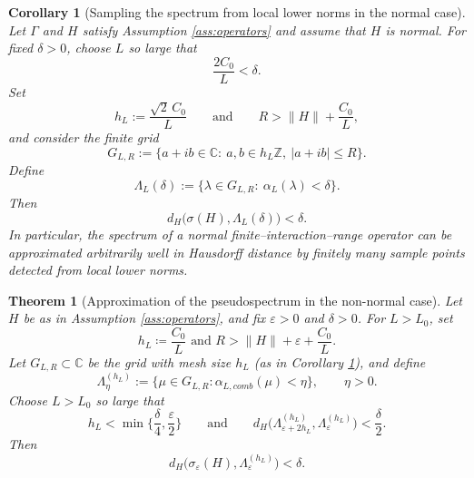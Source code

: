 \documentclass[10pt,a4paper]{amsart}
\newtheorem{corollary}{Corollary}
\newtheorem{theorem}{Theorem}
\newcommand{\C}{\mathbb{C}}
\newcommand{\Z}{\mathbb{Z}}
\begin{document}
\begin{corollary}[Sampling the spectrum from local lower norms in the normal case]
\label{cor:normal-sampling-grid}
Let $\Gamma$ and $H$ satisfy Assumption \ref{ass:operators} and assume that $H$ is normal. 
For fixed $\delta>0$, choose $L$ so large that
\[
  \frac{2C_0}{L}<\delta.
\]
Set
\[
  h_L:=\frac{\sqrt2\,C_0}{L}
  \qquad\text{and}\qquad
  R>\|H\|+\frac{C_0}{L},
\]
and consider the finite grid
\[
  G_{L,R}
  :=\bigl\{a+ib\in\C:\ a,b\in h_L\Z,\ |a+ib|\le R\bigr\}.
\]
Define
\[
  \Lambda_L(\delta)
  :=\bigl\{\lambda\in G_{L,R}:\ \alpha_L(\lambda)<\delta\bigr\}.
\]
Then
\[
  d_H\bigl(\sigma(H),\Lambda_L(\delta)\bigr)<\delta.
\]
In particular, the spectrum of a normal finite--interaction--range operator can be
approximated arbitrarily well in Hausdorff distance by finitely many sample
points detected from local lower norms.
\end{corollary}

\begin{theorem}[Approximation of the pseudospectrum in the non-normal case]
\label{thm:pseudospectrum-nonnormal}
Let $H$ be as in Assumption \ref{ass:operators}, and fix $\varepsilon>0$ and $\delta>0$. For $L>L_0$, set
\[
h_L\coloneqq \frac{C_0}{L} \text{ and } R > \|H\|+\varepsilon+\frac{C_0}{L}.
\]
Let $G_{L,R}\subset\C$ be the grid with mesh size $h_L$ (as in Corollary \ref{cor:normal-sampling-grid}), and define
\[
\Lambda_\eta^{(h_L)}:=\{\mu\in G_{L,R}:\alpha_{L,comb}(\mu) < \eta\},
\qquad \eta > 0.
\]
Choose $L>L_0$ so large that
\[
h_L<\min \{ \frac{\delta}{4}, \frac{\varepsilon}{2} \}
\qquad\text{and}\qquad
d_H\bigl(\Lambda_{\varepsilon+2h_L}^{(h_L)},\Lambda_\varepsilon^{(h_L)}\bigr)<\frac{\delta}{2}.
\]
Then
\[
d_H\bigl(\sigma_\varepsilon(H),\Lambda_\varepsilon^{(h_L)}\bigr)<\delta.
\]
\end{theorem}
\end{document}
